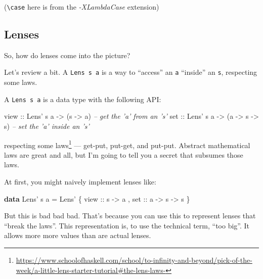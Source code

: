 \documentclass[]{article}
\newenvironment{Shaded}{}{}
\newcommand{\CommentTok}[1]{\textcolor[rgb]{0.38,0.63,0.69}{\textit{#1}}}
\newcommand{\DataTypeTok}[1]{\textcolor[rgb]{0.56,0.13,0.00}{#1}}
\newcommand{\FunctionTok}[1]{\textcolor[rgb]{0.02,0.16,0.49}{#1}}
\newcommand{\KeywordTok}[1]{\textcolor[rgb]{0.00,0.44,0.13}{\textbf{#1}}}
\newcommand{\NormalTok}[1]{#1}
\newcommand{\OtherTok}[1]{\textcolor[rgb]{0.00,0.44,0.13}{#1}}
\renewcommand{\href}[2]{#2\footnote{\url{#1}}}
\begin{document}
(\texttt{\textbackslash{}case} here is from the \emph{-XLambdaCase} extension)

\hypertarget{lenses}{%
\subsection{Lenses}\label{lenses}}

So, how do lenses come into the picture?

Let's review a bit. A \texttt{Lens\textquotesingle{}\ s\ a} is a way to
``access'' an \texttt{a} ``inside'' an \texttt{s}, respecting some laws.

A \texttt{Lens\textquotesingle{}\ s\ a} is a data type with the following API:

\begin{Shaded}
\begin{Highlighting}[]
\OtherTok{view ::} \DataTypeTok{Lens'}\NormalTok{ s a }\OtherTok{->}\NormalTok{ (s }\OtherTok{->}\NormalTok{ a)                }\CommentTok{-- get the 'a' from an 's'}
\OtherTok{set  ::} \DataTypeTok{Lens'}\NormalTok{ s a }\OtherTok{->}\NormalTok{ (a }\OtherTok{->}\NormalTok{ s }\OtherTok{->}\NormalTok{ s)           }\CommentTok{-- set the 'a' inside an 's'}
\end{Highlighting}
\end{Shaded}

respecting
\href{https://www.schoolofhaskell.com/school/to-infinity-and-beyond/pick-of-the-week/a-little-lens-starter-tutorial\#the-lens-laws-}{some
laws} --- get-put, put-get, and put-put. Abstract mathematical laws are great
and all, but I'm going to tell you a secret that subsumes those laws.

At first, you might naively implement lenses like:

\begin{Shaded}
\begin{Highlighting}[]
\KeywordTok{data} \DataTypeTok{Lens'}\NormalTok{ s a }\FunctionTok{=} \DataTypeTok{Lens'}
\NormalTok{    \{}\OtherTok{ view ::}\NormalTok{ s }\OtherTok{->}\NormalTok{ a}
\NormalTok{    ,}\OtherTok{ set  ::}\NormalTok{ a }\OtherTok{->}\NormalTok{ s }\OtherTok{->}\NormalTok{ s}
\NormalTok{    \}}
\end{Highlighting}
\end{Shaded}

But this is bad bad bad. That's because you can use this to represent lenses
that ``break the laws''. This representation is, to use the technical term,
``too big''. It allows more more values than are actual lenses.
\end{document}
